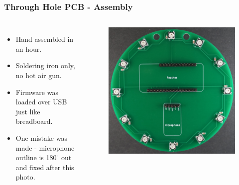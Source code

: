 \documentclass[aspectratio=169, t]{beamer}
\begin{document}
\begin{frame}
\frametitle{Through Hole PCB - Assembly}
\vspace{-5mm}
\begin{columns}
	\begin{itemize}
		\item Hand assembled in an hour.
		\item Soldering iron only, no hot air gun.
		\item Firmware was loaded over USB just like breadboard.
		\item One mistake was made - microphone outline is 180$^\circ$ out and fixed after this photo.
	\end{itemize}
	\begin{figure}
		\includegraphics[width=0.9\linewidth]{images/circle-bare.JPG}
	\end{figure}
\end{columns}
\end{frame}
\end{document}
